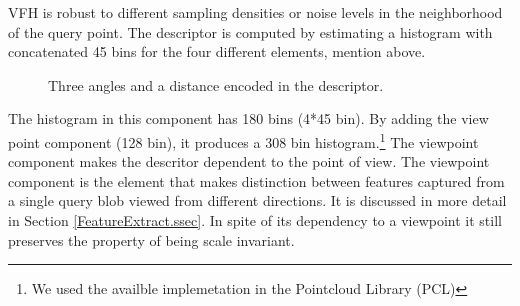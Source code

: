 

VFH is robust to different sampling densities or noise levels in the neighborhood of the query point. 
The descriptor is computed by estimating a histogram with concatenated 45 bins for the four different elements, mention above.


\begin{figure}[t]
  \caption[Local geomentry elements of VFH.]
  {Three angles and a distance encoded in the descriptor.\cite{VFH_Definition}}
  \label{FPFH.figure}
\end{figure}

The histogram in this component has 180 bins (4*45 bin).
By adding the view point component (128 bin), it produces a 308 bin histogram.\footnote{We used the availble implemetation in the Pointcloud Library (PCL)}
The viewpoint component makes the descritor dependent to the point of view. The viewpoint component is the element that makes distinction between features captured from a single query blob viewed from different directions.
It is discussed in more detail in Section \ref{FeatureExtract.ssec}.
In spite of its dependency to a viewpoint it still preserves the property of being scale invariant. 

